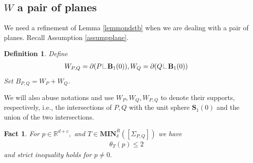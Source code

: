 \documentclass[11pt,a4paper]{amsart}
\numberwithin{equation}{section}
\newcommand{\mn}{\mathbf{MIN}}
\newcommand{\de}{\delta}
\newcommand{\Si}{\Sigma}
\newcommand\res{\mathop{\hbox{\vrule height 7pt width .3pt depth 0pt
			\vrule height .3pt width 5pt depth 0pt}}\nolimits}
\newcommand{\pd}{\partial}
\newcommand{\R}{\mathbb{R}}
\theoremstyle{plain}
\newtheorem{fact}{Fact}[subsection]
\newtheorem{defn}{Definition}[subsection]
\theoremstyle{definition}
\numberwithin{equation}{subsection}
\begin{document}
\subsection{$W$ a pair of planes}
We need a refinement of Lemma \ref{lemmondstb}  when we are dealing with a pair of planes. Recall Assumption \ref{assumpplane}.
\begin{defn}
	Define 
	\begin{align*}
		W_{P,Q}=\pd(P\res \mathbf{B}_1(0)), W_Q=\pd(Q\res \mathbf{B}_1(0))
	\end{align*} Set $ B_{P,Q}=W_P+W_Q$.
\end{defn}
We will also abuse notations and use $W_{P},W_{Q},W_{P,Q}$ to denote their supports, respectively, i.e., the intersections of $P,Q$ with the unit sphere $\mathbf{S}_1(0)$ and the union of the two intersections. 
\begin{fact}\label{fctplane}
	For $p\in \R^{d+c},$ and $T\in\mn^R_\de([\Si_{P,Q}])$ we have
	\begin{align*}
		\theta_T(p)\le 2
	\end{align*}and strict inequality holds for $p\not=0.$
\end{fact}
\end{document}
